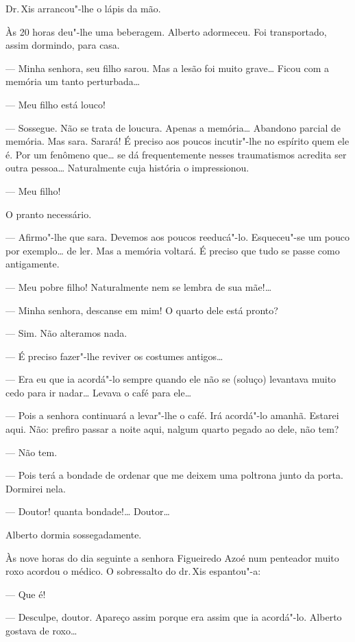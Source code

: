 \begin{linenumbers}
Dr.\,Xis arrancou"-lhe o lápis da mão.

Às 20 horas deu"-lhe uma beberagem. Alberto adormeceu. Foi transportado,
assim dormindo, para casa.

--- Minha senhora, seu filho sarou. Mas a lesão foi muito grave\ldots{} Ficou
com a memória um tanto perturbada\ldots{}

--- Meu filho está louco!

--- Sossegue. Não se trata de loucura. Apenas a memória\ldots{} Abandono
parcial de memória. Mas sara. Sarará! É preciso aos poucos incutir"-lhe
no espírito quem ele é. Por um fenômeno que\ldots{} se dá frequentemente
nesses traumatismos acredita ser outra pessoa\ldots{} Naturalmente cuja
história o impressionou.

--- Meu filho!

O pranto necessário.

--- Afirmo"-lhe que sara. Devemos aos poucos reeducá"-lo. Esqueceu"-se um
pouco por exemplo\ldots{} de ler. Mas a memória voltará. É preciso que tudo
se passe como antigamente.

--- Meu pobre filho! Naturalmente nem se lembra de sua mãe!\ldots{}

--- Minha senhora, descanse em mim! O quarto dele está pronto?

--- Sim. Não alteramos nada.

--- É preciso fazer"-lhe reviver os costumes antigos\ldots{}

--- Era eu que ia acordá"-lo sempre quando ele não se (soluço) levantava
muito cedo para ir nadar\ldots{} Levava o café para ele\ldots{}

--- Pois a senhora continuará a levar"-lhe o café. Irá acordá"-lo amanhã.
Estarei aqui. Não: prefiro passar a noite aqui, nalgum quarto pegado ao
dele, não tem?

--- Não tem.

--- Pois terá a bondade de ordenar que me deixem uma poltrona junto da
porta. Dormirei nela.

--- Doutor! quanta bondade!\ldots{} Doutor\ldots{}

Alberto dormia sossegadamente.

Às nove horas do dia seguinte a senhora Figueiredo Azoé num penteador
muito roxo acordou o médico. O sobressalto do dr.\,Xis espantou"-a:

--- Que é!

--- Desculpe, doutor. Apareço assim porque era assim que ia acordá"-lo.
Alberto gostava de roxo\ldots{}


\end{linenumbers}
